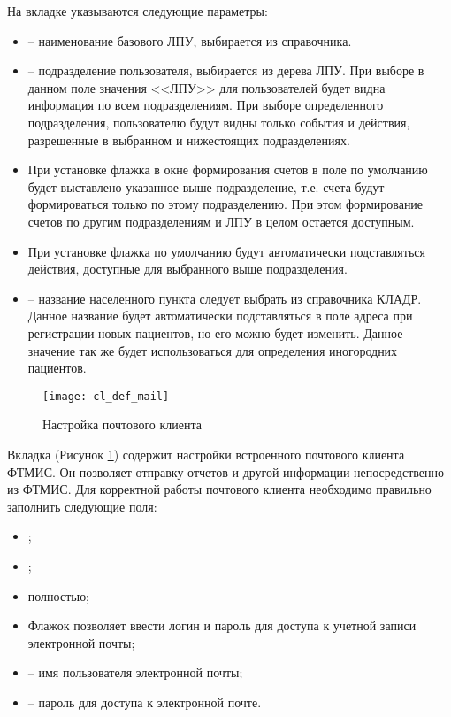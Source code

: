 На вкладке  указываются следующие параметры:
\begin{itemize}
 \item {} – наименование базового ЛПУ, выбирается из справочника.
 \item {} – подразделение пользователя, выбирается из дерева ЛПУ. При выборе в данном поле значения <<ЛПУ>> для пользователей будет видна информация по всем подразделениям. При выборе определенного подразделения, пользователю будут видны только события и действия, разрешенные в выбранном и нижестоящих подразделениях.
 \item При установке флажка  в окне формирования счетов в поле  по умолчанию будет выставлено указанное выше подразделение, т.е. счета будут формироваться только по этому подразделению. При этом формирование счетов по другим подразделениям и ЛПУ в целом остается доступным.
 \item При установке флажка  по умолчанию будут автоматически подставляться действия, доступные для выбранного выше подразделения.
 \item {} – название населенного пункта следует выбрать из справочника КЛАДР. Данное название будет автоматически подставляться в поле адреса при регистрации новых пациентов, но его можно будет изменить. Данное значение так же будет использоваться для определения иногородних пациентов.
\end{itemize}

\begin{figure}[ht]\centering
 \texttt{[image: cl\_def\_mail]}
 \caption{Настройка почтового клиента}
 \label{img_cl_def_mail}
\end{figure} 

Вкладка  (Рисунок \ref{img_cl_def_mail}) содержит настройки встроенного почтового клиента ФТМИС. Он позволяет отправку отчетов и другой информации непосредственно из ФТМИС. Для корректной работы почтового клиента необходимо правильно заполнить следующие поля:
\begin{itemize}
 \item {};
 \item {};
 \item {} полностью;
 \item Флажок  позволяет ввести логин и пароль для доступа к учетной записи электронной почты;
 \item {} – имя пользователя электронной почты;
 \item {} – пароль для доступа к электронной почте.
\end{itemize}

